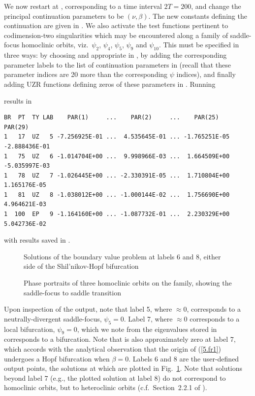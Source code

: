 \documentclass[12pt]{report}
\begin{document}
We now restart at , corresponding to a time interval $2T=200$,
and change the principal continuation parameters to be $(\nu,\beta)$.
The new constants defining the continuation are given in .
We also activate the test functions pertinent to codimension-two
singularities which may be encountered along a family of saddle-focus
homoclinic orbits, viz.\ $\psi_2$, $\psi_4$, $\psi_5$, $\psi_9$ and $\psi_{10}$.
This must be specified in three ways: by choosing  and appropriate
 in , by adding the corresponding parameter labels
to the list of continuation parameters  in 
(recall that these parameter indices are 20 more than the corresponding
$\psi$ indices), and finally adding UZR functions defining zeros of
these parameters in . Running 
\begin{center}  
\end{center} 
results in
\begin{verbatim}
BR  PT  TY LAB    PAR(1)     ...    PAR(2)     ...    PAR(25)       PAR(29)    
1   17  UZ   5 -7.256925E-01 ...  4.535645E-01 ... -1.765251E-05 -2.888436E-01
1   75  UZ   6 -1.014704E+00 ...  9.998966E-03 ...  1.664509E+00 -5.035997E-03
1   78  UZ   7 -1.026445E+00 ... -2.330391E-05 ...  1.710804E+00  1.165176E-05
1   81  UZ   8 -1.038012E+00 ... -1.000144E-02 ...  1.756690E+00  4.964621E-03  
1  100  EP   9 -1.164160E+00 ... -1.087732E-01 ...  2.230329E+00  5.042736E-02
\end{verbatim}
with results saved in .
\begin{figure}[p]
\epsfysize 9.0cm
\centerline{}
\caption{Solutions of the boundary value problem at labels 6 and 8, 
either side of the Shil'nikov-Hopf bifurcation}
\label{Fcircuit1}
\end{figure}
\begin{figure}[p]
\epsfysize 9.0cm
\centerline{}
\caption{Phase portraits of three homoclinic orbits 
on the family, showing the saddle-focus to saddle transition}
\label{Fcircuit2}
\end{figure}
Upon inspection of the output, note that label 5, where $\approx 0$, 
corresponds to a neutrally-divergent saddle-focus, $\psi_5=0$. 
Label 7, where $\approx 0$ corresponds to a local bifurcation, $\psi_9=0$, 
which we note from the eigenvalues stored in  corresponds to a  bifurcation. Note that  is also approximately zero
at label 7, which accords with the analytical observation that the origin of
(\ref{5.fr1}) undergoes a Hopf bifurcation when $\beta=0$.
Labels 6 and 8 are the user-defined output
points, the solutions at which are plotted in Fig.\ \ref{Fcircuit1}.
Note that solutions beyond label 7 (e.g., the plotted solution
at label 8) do not correspond to homoclinic orbits, but to 
 heteroclinic orbits (c.f.\ Section~2.2.1 of
).
\end{document}
